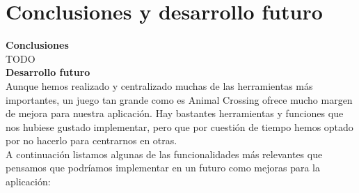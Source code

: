 \chapter{Conclusiones y desarrollo futuro}\label{pruebas}

\textbf{\large Conclusiones}\\

TODO\\

\textbf{\large Desarrollo futuro}\\

Aunque hemos realizado y centralizado muchas de las herramientas más importantes, un juego tan grande como es Animal Crossing ofrece mucho margen de mejora para nuestra aplicación. Hay bastantes herramientas y funciones que nos hubiese gustado implementar, pero que por cuestión de tiempo hemos optado por no hacerlo para centrarnos en otras.\\

A continuación listamos algunas de las funcionalidades más relevantes que pensamos que podríamos implementar en un futuro como mejoras para la aplicación:

